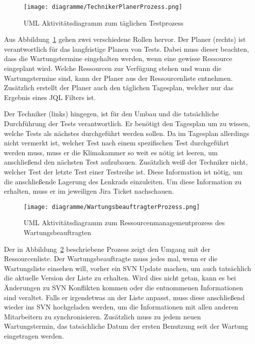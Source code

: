 \begin{figure}[H]
    \texttt{[image: diagramme/TechnikerPlanerProzess.png]}
    \caption{UML Aktivitätsdiagramm zum täglichen Testprozess}\label{fig:TechnikerPlanerProzess}
\end{figure}

Aus Abbildung~\ref{fig:TechnikerPlanerProzess} gehen zwei verschiedene Rollen hervor. Der
Planer (rechts) ist verantwortlich für das langfristige Planen von Tests. Dabei muss
dieser beachten, dass die Wartungstermine eingehalten werden, wenn
eine gewisse Ressource eingeplant wird. Welche Ressourcen zur
Verfügung stehen und wann die Wartungstermine sind, kann der Planer aus
der Ressourcenliste entnehmen. Zusätzlich erstellt der Planer auch den täglichen 
Tagesplan, welcher nur das Ergebnis eines \gls{JQL} Filters ist. 

Der Techniker (links) hingegen, ist für den Umbau und die tatsächliche Durchführung der 
Tests verantwortlich. Er benötigt den Tagesplan um zu wissen, welche Tests als 
nächstes durchgeführt werden sollen. Da im Tagesplan allerdings nicht vermerkt ist, 
welcher Test nach einem spezifischen Test durchgeführt werden muss, muss er die 
Klimakammer so weit es nötig ist leeren, um anschließend den nächsten Test 
aufzubauen. Zusätzlich weiß der Techniker nicht, welcher Test der letzte Test einer Testreihe ist.
Diese Information ist nötig, um die anschließende Lagerung des Lenkrads einzuleiten.
Um diese Information zu erhalten, muss er im jeweiligen \gls{Jira} Ticket nachschauen. \\

\begin{figure}[H]
    \texttt{[image: diagramme/WartungsbeauftragterProzess.png]}
    \caption{UML Aktivitätsdiagramm zum Ressourcenmanagementprozess des Wartungsbeauftragten}\label{fig:WarterProzess}
\end{figure}

Der in Abbildung~\ref{fig:WarterProzess} beschriebene Prozess zeigt den Umgang mit der 
Ressourcenliste. Der Wartungsbeauftragte muss jedes mal, wenn er die Wartungsliste
einsehen will, vorher ein \gls{SVN} Update machen, um auch tatsächlich die aktuelle
Version der Liste zu erhalten. Wird dies nicht getan, kann es bei Änderungen 
zu \gls{SVN} Konflikten kommen oder die entnommenen Informationen sind veraltet.
Falls er irgendetwas an der Liste anpasst, muss diese anschließend wieder ins 
\gls{SVN} hochgeladen werden, um die Informationen mit allen anderen Mitarbeitern
zu synchronisieren. Zusätzlich muss zu jedem neuen Wartungstermin, das tatsächliche
Datum der ersten Benutzung seit der Wartung eingetragen werden. \\

